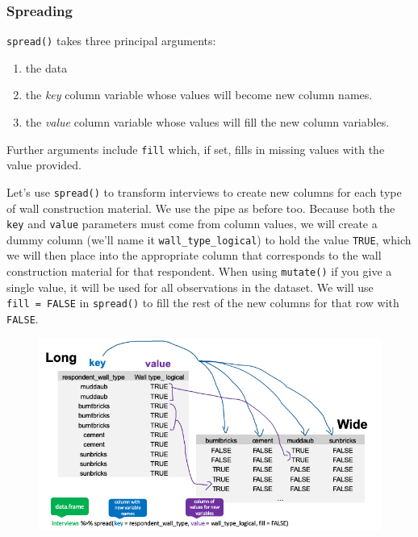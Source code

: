 \documentclass[]{book}
\newenvironment{Shaded}{\begin{snugshade}}{\end{snugshade}}
\newcommand{\KeywordTok}[1]{\textcolor[rgb]{0.13,0.29,0.53}{\textbf{#1}}}
\newcommand{\DataTypeTok}[1]{\textcolor[rgb]{0.13,0.29,0.53}{#1}}
\newcommand{\StringTok}[1]{\textcolor[rgb]{0.31,0.60,0.02}{#1}}
\newcommand{\OtherTok}[1]{\textcolor[rgb]{0.56,0.35,0.01}{#1}}
\newcommand{\OperatorTok}[1]{\textcolor[rgb]{0.81,0.36,0.00}{\textbf{#1}}}
\newcommand{\NormalTok}[1]{#1}
\providecommand{\tightlist}{%
  \setlength{\itemsep}{0pt}\setlength{\parskip}{0pt}}
\begin{document}
\subsubsection{Spreading}\label{spreading}

\texttt{spread()} takes three principal arguments:

\begin{enumerate}
\def\labelenumi{\arabic{enumi}.}
\tightlist
\item
  the data
\item
  the \emph{key} column variable whose values will become new column
  names.
\item
  the \emph{value} column variable whose values will fill the new column
  variables.
\end{enumerate}

Further arguments include \texttt{fill} which, if set, fills in missing
values with the value provided.

Let's use \texttt{spread()} to transform interviews to create new
columns for each type of wall construction material. We use the pipe as
before too. Because both the \texttt{key} and \texttt{value} parameters
must come from column values, we will create a dummy column (we'll name
it \texttt{wall\_type\_logical}) to hold the value \texttt{TRUE}, which
we will then place into the appropriate column that corresponds to the
wall construction material for that respondent. When using
\texttt{mutate()} if you give a single value, it will be used for all
observations in the dataset. We will use \texttt{fill\ =\ FALSE} in
\texttt{spread()} to fill the rest of the new columns for that row with
\texttt{FALSE}.

\begin{Shaded}
\end{Shaded}

\begin{figure}
\centering
\includegraphics{../fig/long_to_wide.png}
\caption{}
\end{figure}
\end{document}
